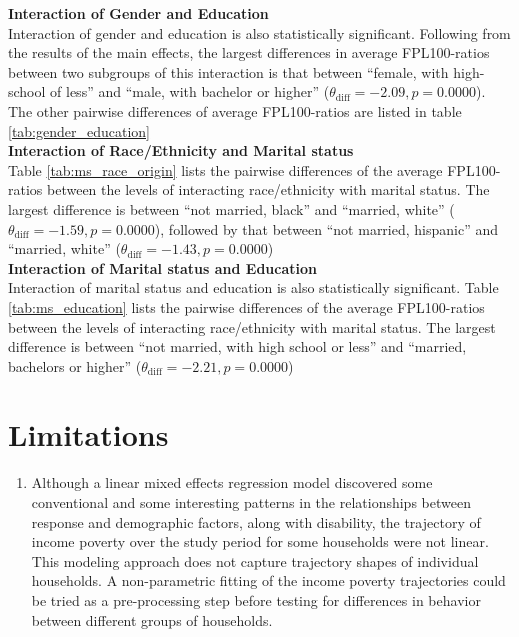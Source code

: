 \documentclass[11pt]{extarticle} %
\begin{document}
\noindent
{\bf{Interaction of Gender and Education}} \\
Interaction of gender and education is also statistically significant. Following from the results of the main effects, the largest differences in average FPL100-ratios between two subgroups of this interaction is that between ``female, with high-school of less'' and ``male, with bachelor or higher'' ($\theta_{\text{diff}} = -2.09, p = 0.0000 $). The other pairwise differences of average FPL100-ratios are listed in table \ref{tab:gender_education}\\
\noindent
{\bf{Interaction of Race/Ethnicity and Marital status}} \\
Table \ref{tab:ms_race_origin} lists the pairwise differences of the average FPL100-ratios between the levels of interacting race/ethnicity with marital status. The largest difference is between ``not married, black'' and ``married, white'' ($\theta_{\text{diff}} = -1.59, p = 0.0000 $), followed by that between ``not married, hispanic'' and ``married, white'' ($\theta_{\text{diff}} = -1.43, p = 0.0000 $) \\
\noindent
{\bf{Interaction of Marital status and Education}} \\
Interaction of marital status and education is also statistically significant. Table \ref{tab:ms_education} lists the pairwise differences of the average FPL100-ratios between the levels of interacting race/ethnicity with marital status. The largest difference is between ``not married, with high school or less'' and ``married, bachelors or higher'' ($\theta_{\text{diff}} = -2.21, p = 0.0000 $)\\


\section*{Limitations}
\begin{enumerate}
\item Although a linear mixed effects regression model discovered some conventional and some interesting patterns in the relationships between response and demographic factors, along with disability, the trajectory of income poverty over the study period for some households were not linear. This modeling approach does not capture trajectory shapes of individual households. A non-parametric fitting of the income poverty trajectories could be tried as a pre-processing step before testing for differences in behavior between different groups of households. 
\end{enumerate}

\newpage




\newpage

\end{document}
